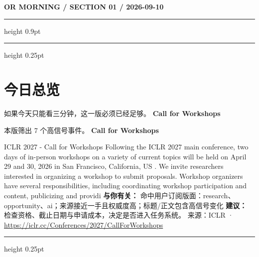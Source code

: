 \documentclass[10.5pt]{ctexart}
\begin{document}
{\small\bfseries OR MORNING / SECTION 01 / 2026-09-10}
\vspace{2mm}
\hrule height 0.9pt
\vspace{1.5mm}
\hrule height 0.25pt
\vspace{4mm}
\section*{今日总览}
{\color{ormuted} 如果今天只能看三分钟，这一版必须已经足够。}
\vspace{2mm}
{\fontsize{25}{29}\selectfont\bfseries Call for Workshops}\par
\vspace{2mm}
{\large 本版筛出 7 个高信号事件。}
\vspace{3mm}
{\Large\bfseries Call for Workshops}\par
ICLR 2027 - Call for Workshops Following the ICLR 2027 main conference, two days of in-person workshops on a variety of current topics will be held on April 29 and 30, 2026 in San Francisco, California, US . We invite researchers interested in organizing a workshop to submit proposals. Workshop organizers have several responsibilities, including coordinating workshop participation and content, publicizing and providi
\textbf{与你有关：} 命中用户订阅版面：research、opportunity、ai；来源接近一手且权威度高；标题/正文包含高信号变化
\textbf{建议：} 检查资格、截止日期与申请成本，决定是否进入任务系统。
{\footnotesize\color{ormuted} 来源：ICLR · \url{https://iclr.cc/Conferences/2027/CallForWorkshops}}
\vspace{3mm}
\hrule height 0.25pt
\vspace{3mm}
\end{document}
